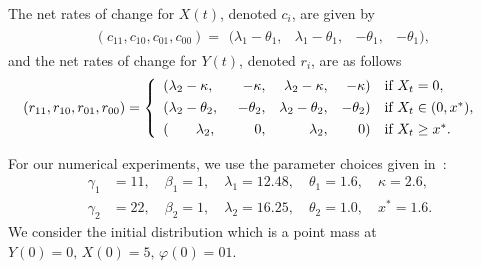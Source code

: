 \begin{model}
	The net rates of change for $X(t)$, denoted $c_i$, are given by 
	\begin{align*} 
	& (c_{11},c_{10},c_{01},c_{00})   =  \begin{array}{rrrr} 
	(\lambda_1-\theta_1,  & \lambda_1 -\theta_1, &  -\theta_1, & -\theta_1),
	\end{array}  
	\end{align*} 
	and the net rates of change for $Y(t)$, denoted $r_i$, are as follows  
	\begin{align*} 
	(r_{11},r_{10},r_{01},r_{00})  & = \left\{ \begin{array}{lrrrll}  
												(\lambda_2 - \kappa, & \;\;\;-\kappa,  & \lambda_2 - \kappa, & -\kappa) &\text{if } X_t = 0, \\
												\vspace*{-0.3cm} \\
		(\lambda_2 - \theta_2, & -\theta_2, & \lambda_2 - \theta_2, & -\theta_2) & \text{if } X_t \in (0,x^*),\\
												\vspace*{-0.3cm} \\
		(\;\;\;\;\;\;\; \lambda_2, & \;\;\;\;0, & \lambda_2, &  \;\;\;\;0) & \text{if } X_t \geq x^*. \end{array}
												\right.
	\end{align*} 

	For our numerical experiments, we use the parameter choices given in~\citep{lnp13}: 
		\begin{align} 
			\label{eqn:parameters}
		\gamma_1 & =11, \quad  \beta_1 = 1, \quad \lambda_1 = 12.48, \quad  \theta_1 = 1.6, \quad  \kappa = 2.6, \\
			\label{eqn:parameters-2}
		\gamma_2 & = 22, \quad \beta_2  = 1, \quad  \lambda_2 = 16.25, \quad \theta_2 = 1.0, \quad x^* = 1.6.
		\end{align} 
	We consider the initial distribution which is a point mass at \(Y(0)=0,\, X(0)=5,\, \varphi(0)=01\). 
\end{model}
	
